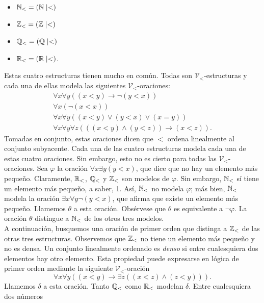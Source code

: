 \documentclass[12pt,a4paper]{book}
\newcommand{\VV}{\mathcal{V}}
\begin{document}
    \begin{itemize}
        \item[$\bullet$] $\mathbb{N}_{<}=(\mathbb{N}\mid<)$
        \item[$\bullet$] $\mathbb{Z}_{<}=(\mathbb{Z}\mid<)$
        \item[$\bullet$] $\mathbb{Q}_{<}=(\mathbb{Q}\mid<)$
        \item[$\bullet$] $\mathbb{R}_{<}=(\mathbb{R}\mid<)$.
    \end{itemize}

    Estas cuatro estructuras tienen mucho en común. Todas son $\VV_{<}$-estructuras y cada una de ellas modela las
    siguientes $\VV_{<}$-oraciones:
    \begin{gather*}
        \forall x\forall y((x<y)\rightarrow\neg(y<x))\\
        \forall x(\neg(x<x))\\
        \forall x\forall y((x<y)\vee(y<x)\vee(x=y))\\
        \forall x\forall y\forall z(((x<y)\wedge(y<z))\rightarrow(x<z)).
    \end{gather*}
    Tomadas en conjunto, estas oraciones dicen que $<$ ordena linealmente al conjunto subyacente. Cada una de las cuatro
    estructuras modela cada una de estas cuatro oraciones. Sin embargo, esto no es cierto para todas las
    $\VV_{<}$-oraciones. Sea $\varphi$ la oración $\forall x\exists y(y<x)$, que dice que no hay un elemento más pequeño.
    Claramente, $\mathbb{R}_{<}$, $\mathbb{Q}_{<}$ y $\mathbb{Z}_{<}$ son modelos de $\varphi$. Sin embargo, $\mathbb{N}_{<}$ sí tiene un elemento más
    pequeño, a saber, 1. Así, $\mathbb{N}_{<}$ no modela $\varphi$; más bien, $\mathbb{N}_{<}$ modela la oración
    $\exists x\forall y\neg(y<x)$, que afirma que existe un elemento más pequeño. Llamemos $\theta$ a esta oración.
    Obsérvese que $\theta$ es equivalente a $\neg\varphi$. La oración $\theta$ distingue a $\mathbb{N}_{<}$ de los otros tres
    modelos.\\
    A continuación, busquemos una oración de primer orden que distinga a $\mathbb{Z}_{<}$ de las otras tres estructuras.
    Observemos que $\mathbb{Z}_{<}$ no tiene un elemento más pequeño y no es densa. Un conjunto linealmente ordenado es
    \textit{denso} si entre cualesquiera dos elementos hay otro elemento. Esta propiedad puede expresarse en lógica de
    primer orden mediante la siguiente $\VV_{<}$-oración
    \begin{equation*}
        \forall x\forall y((x<y)\rightarrow\exists z((x<z)\wedge(z<y))).
    \end{equation*}
    Llamemos $\delta$ a esta oración. Tanto $\mathbb{Q}_{<}$ como $\mathbb{R}_{<}$ modelan $\delta$. Entre cualesquiera dos números
\end{document}
